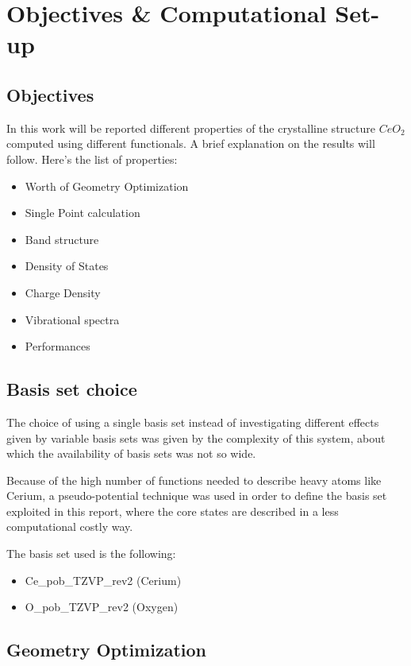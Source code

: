 \documentclass{article}
\begin{document}
\newpage
\section{Objectives \& Computational Set-up}
\subsection{Objectives}
In this work will be reported different properties of the crystalline structure $CeO_2$ computed using different functionals. A brief explanation on the results will follow.
Here's the list of properties:
\begin{itemize}
	\item Worth of Geometry Optimization 
	\item Single Point calculation
	\item Band structure 
	\item Density of States
	\item Charge Density
	\item Vibrational spectra
	\item Performances 
\end{itemize}

\subsection{Basis set choice}

The choice of using a single basis set instead of investigating different effects given by variable basis sets was given by the complexity of this system, about which the availability of basis sets was not so wide.

Because of the high number of functions needed to describe heavy atoms like Cerium, a pseudo-potential technique was used in order to define the basis set exploited in this report, where the core states are described in a less computational costly way.

\vspace{15pt}

\noindent The basis set used is the following:
\begin{itemize}
	\item Ce\_pob\_TZVP\_rev2 (Cerium)
	\item O\_pob\_TZVP\_rev2 (Oxygen)
\end{itemize}

\subsection{Geometry Optimization}
\end{document}
